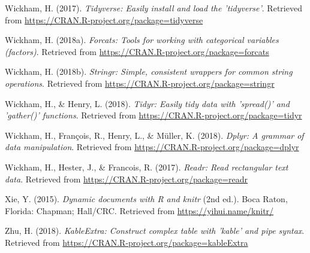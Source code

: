 \documentclass[man]{apa6}
\begin{document}
\hypertarget{ref-R-tidyverse}{}
Wickham, H. (2017). \emph{Tidyverse: Easily install and load the
'tidyverse'}. Retrieved from
\url{https://CRAN.R-project.org/package=tidyverse}

\hypertarget{ref-R-forcats}{}
Wickham, H. (2018a). \emph{Forcats: Tools for working with categorical
variables (factors)}. Retrieved from
\url{https://CRAN.R-project.org/package=forcats}

\hypertarget{ref-R-stringr}{}
Wickham, H. (2018b). \emph{Stringr: Simple, consistent wrappers for
common string operations}. Retrieved from
\url{https://CRAN.R-project.org/package=stringr}

\hypertarget{ref-R-tidyr}{}
Wickham, H., \& Henry, L. (2018). \emph{Tidyr: Easily tidy data with
'spread()' and 'gather()' functions}. Retrieved from
\url{https://CRAN.R-project.org/package=tidyr}

\hypertarget{ref-R-dplyr}{}
Wickham, H., François, R., Henry, L., \& Müller, K. (2018). \emph{Dplyr:
A grammar of data manipulation}. Retrieved from
\url{https://CRAN.R-project.org/package=dplyr}

\hypertarget{ref-R-readr}{}
Wickham, H., Hester, J., \& Francois, R. (2017). \emph{Readr: Read
rectangular text data}. Retrieved from
\url{https://CRAN.R-project.org/package=readr}

\hypertarget{ref-R-knitr}{}
Xie, Y. (2015). \emph{Dynamic documents with R and knitr} (2nd ed.).
Boca Raton, Florida: Chapman; Hall/CRC. Retrieved from
\url{https://yihui.name/knitr/}

\hypertarget{ref-R-kableExtra}{}
Zhu, H. (2018). \emph{KableExtra: Construct complex table with 'kable'
and pipe syntax}. Retrieved from
\url{https://CRAN.R-project.org/package=kableExtra}

\endgroup
\end{document}
